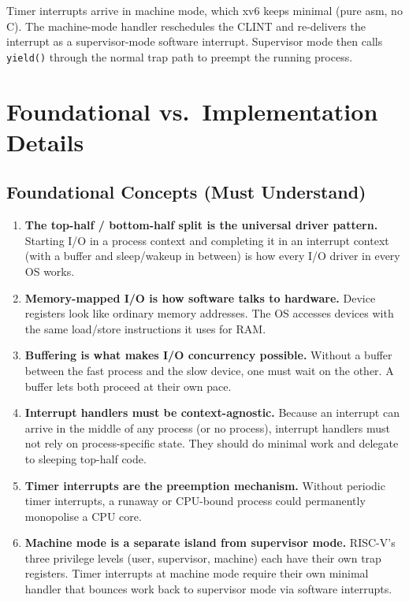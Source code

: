 \documentclass[11pt, a4paper]{article}
\begin{document}
\begin{tcolorbox}[summary, title={Section Summary}]
Timer interrupts arrive in machine mode, which xv6 keeps minimal (pure asm, no C). The machine-mode handler reschedules the CLINT and re-delivers the interrupt as a supervisor-mode software interrupt. Supervisor mode then calls \lstinline|yield()| through the normal trap path to preempt the running process.
\end{tcolorbox}

\section{Foundational vs.\ Implementation Details}

\subsection{Foundational Concepts (Must Understand)}

\begin{tcolorbox}[foundational, title={Foundational Concepts}]
\begin{enumerate}[leftmargin=1.8em, itemsep=0.3em]
  \item \textbf{The top-half / bottom-half split is the universal driver pattern.}
        Starting I/O in a process context and completing it in an interrupt context (with a buffer and sleep/wakeup in between) is how every I/O driver in every OS works.

  \item \textbf{Memory-mapped I/O is how software talks to hardware.}
        Device registers look like ordinary memory addresses. The OS accesses devices with the same load/store instructions it uses for RAM.

  \item \textbf{Buffering is what makes I/O concurrency possible.}
        Without a buffer between the fast process and the slow device, one must wait on the other. A buffer lets both proceed at their own pace.

  \item \textbf{Interrupt handlers must be context-agnostic.}
        Because an interrupt can arrive in the middle of any process (or no process), interrupt handlers must not rely on process-specific state. They should do minimal work and delegate to sleeping top-half code.

  \item \textbf{Timer interrupts are the preemption mechanism.}
        Without periodic timer interrupts, a runaway or CPU-bound process could permanently monopolise a CPU core.

  \item \textbf{Machine mode is a separate island from supervisor mode.}
        RISC-V's three privilege levels (user, supervisor, machine) each have their own trap registers. Timer interrupts at machine mode require their own minimal handler that bounces work back to supervisor mode via software interrupts.
\end{enumerate}
\end{tcolorbox}
\end{document}
